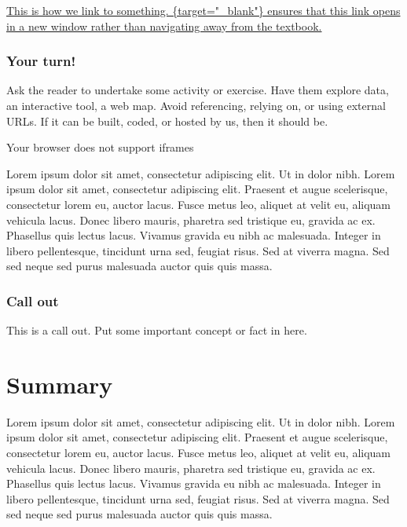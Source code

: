 \documentclass[
]{book}
\begin{document}
\href{https://google.com}{This is how we link to something. \{target="\_blank"\} ensures that this link opens in a new window rather than navigating away from the textbook.}

\hypertarget{your-turn-1}{%
\subsubsection*{Your turn!}\label{your-turn-1}}

Ask the reader to undertake some activity or exercise. Have them explore data, an interactive tool, a web map. Avoid referencing, relying on, or using external URLs. If it can be built, coded, or hosted by us, then it should be.

Your browser does not support iframes

Lorem ipsum dolor sit amet, consectetur adipiscing elit. Ut in dolor nibh. Lorem ipsum dolor sit amet, consectetur adipiscing elit. Praesent et augue scelerisque, consectetur lorem eu, auctor lacus. Fusce metus leo, aliquet at velit eu, aliquam vehicula lacus. Donec libero mauris, pharetra sed tristique eu, gravida ac ex. Phasellus quis lectus lacus. Vivamus gravida eu nibh ac malesuada. Integer in libero pellentesque, tincidunt urna sed, feugiat risus. Sed at viverra magna. Sed sed neque sed purus malesuada auctor quis quis massa.

\hypertarget{call-out}{%
\subsubsection*{Call out}\label{call-out}}

This is a call out. Put some important concept or fact in here.

\hypertarget{summary-1}{%
\section{Summary}\label{summary-1}}

Lorem ipsum dolor sit amet, consectetur adipiscing elit. Ut in dolor nibh. Lorem ipsum dolor sit amet, consectetur adipiscing elit. Praesent et augue scelerisque, consectetur lorem eu, auctor lacus. Fusce metus leo, aliquet at velit eu, aliquam vehicula lacus. Donec libero mauris, pharetra sed tristique eu, gravida ac ex. Phasellus quis lectus lacus. Vivamus gravida eu nibh ac malesuada. Integer in libero pellentesque, tincidunt urna sed, feugiat risus. Sed at viverra magna. Sed sed neque sed purus malesuada auctor quis quis massa.
\end{document}
